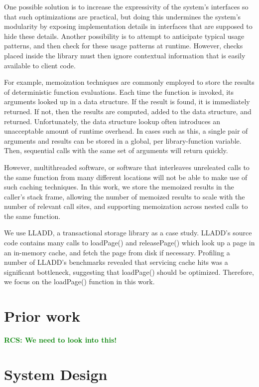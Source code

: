 \documentclass[10pt,letterpaper,twocolumn,english]{article}
\newcommand{\yad}{LLADD\xspace}
\newcommand{\pin}{loadPage()\xspace}
\newcommand{\unpin}{releasePage()\xspace}
\newcommand{\rcs}[1]{\textcolor{green}{\bf RCS: #1}}
\begin{document}
One possible solution is to increase the expressivity of the system's
interfaces so that such optimizations are practical, but doing this
undermines the system's modularity by exposing implementation details
in interfaces that are supposed to hide these details.  Another
possibility is to attempt to anticipate typical usage patterns, and
then check for these usage patterns at runtime.  However, checks
placed inside the library must then ignore contextual information that
is easily available to client code.

For example, memoization techniques are commonly employed to store the
results of deterministic function evaluations.  Each time the function
is invoked, its arguments looked up in a data structure.  If the
result is found, it is immediately returned.  If not, then the results
are computed, added to the data structure, and returned.
Unfortunately, the data structure lookup often introduces an
unacceptable amount of runtime overhead.  In cases such as this, a
single pair of arguments and results can be stored in a global, per
library-function variable.  Then, sequential calls with the same set
of arguments will return quickly.  

However, multithreaded software, or software that interleaves
unreleated calls to the same function from many different locations
will not be able to make use of such caching techniques.  In this
work, we store the memoized results in the caller's stack frame,
allowing the number of memoized results to scale with the number of
relevant call sites, and supporting memoization across nested calls to
the same function.

We use \yad, a transactional storage library as a case study.  \yad's
source code contains many calls to \pin and \unpin which look up a
page in an in-memory cache, and fetch the page from disk if necessary.
Profiling a number of \yad's benchmarks revealed that servicing cache
hits was a significant bottleneck, suggesting that \pin should be
optimized.  Therefore, we focus on the \pin function in this work.

\section{Prior work}
\label {prior}

\rcs{We need to look into this!}

\section{System Design}
\end{document}
